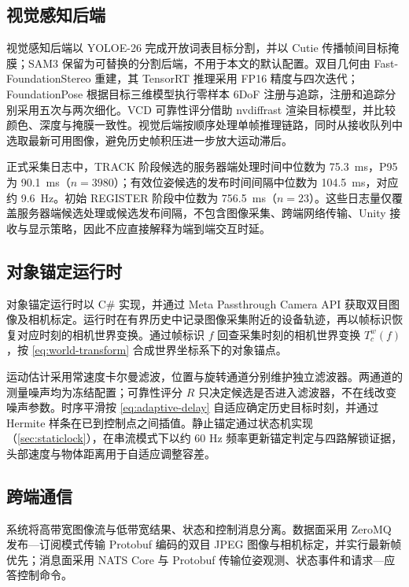 \documentclass[review]{vgtc}
\begin{document}
\subsection{视觉感知后端}


视觉感知后端以 YOLOE-26 完成开放词表目标分割，并以 Cutie 传播帧间目标掩膜；SAM3 保留为可替换的分割后端，不用于本文的默认配置。双目几何由 Fast-FoundationStereo 重建，其 TensorRT 推理采用 FP16 精度与四次迭代；FoundationPose 根据目标三维模型执行零样本 6DoF 注册与追踪，注册和追踪分别采用五次与两次细化。VCD 可靠性评分借助 nvdiffrast 渲染目标模型，并比较颜色、深度与掩膜一致性。视觉后端按顺序处理单帧推理链路，同时从接收队列中选取最新可用图像，避免历史帧积压进一步放大运动滞后。

正式采集日志中，TRACK 阶段候选的服务器端处理时间中位数为 75.3~ms，P95 为 90.1~ms（$n=3980$）；有效位姿候选的发布时间间隔中位数为 104.5~ms，对应约 9.6~Hz。初始 REGISTER 阶段中位数为 756.5~ms（$n=23$）。这些日志量仅覆盖服务器端候选处理或候选发布间隔，不包含图像采集、跨端网络传输、Unity 接收与显示策略，因此不应直接解释为端到端交互时延。

\subsection{对象锚定运行时}


对象锚定运行时以 C\# 实现，并通过 Meta Passthrough Camera API 获取双目图像及相机标定。运行时在有界历史中记录图像采集附近的设备轨迹，再以帧标识恢复对应时刻的相机世界变换。通过帧标识 $f$ 回查采集时刻的相机世界变换 $T_c^w (f)$，按 \ref{eq:world-transform} 合成世界坐标系下的对象锚点。

运动估计采用常速度卡尔曼滤波，位置与旋转通道分别维护独立滤波器。两通道的测量噪声均为冻结配置；可靠性评分 $R$ 只决定候选是否进入滤波器，不在线改变噪声参数。时序平滑按 \ref{eq:adaptive-delay} 自适应确定历史目标时刻，并通过 Hermite 样条在已到控制点之间插值。静止锚定通过状态机实现（\ref{sec:staticlock}），在串流模式下以约 60 Hz 频率更新锚定判定与四路解锁证据，头部速度与物体距离用于自适应调整容差。

\subsection{跨端通信}


系统将高带宽图像流与低带宽结果、状态和控制消息分离。数据面采用 ZeroMQ 发布---订阅模式传输 Protobuf 编码的双目 JPEG 图像与相机标定，并实行最新帧优先；消息面采用 NATS Core 与 Protobuf 传输位姿观测、状态事件和请求---应答控制命令。
\end{document}
